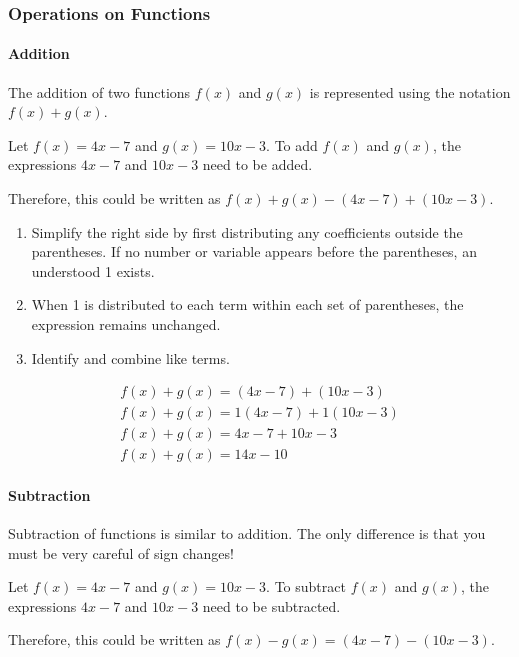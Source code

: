\subsubsection*{Operations on Functions}

\paragraph*{Addition}

The addition of two functions $f(x)$ and $g(x)$ is represented using the
notation $f(x) + g(x)$.

Let $f(x) = 4x - 7$ and $g(x) = 10x - 3$. To add $f(x)$ and $g(x)$, the
expressions $4x - 7$ and $10x - 3$ need to be added.

Therefore, this could be written as $f(x) + g(x) - (4x - 7) + (10x - 3)$.

\begin{enumerate}
    \item Simplify the right side by first distributing any coefficients
        outside the parentheses. If no number or variable appears before the
        parentheses, an understood 1 exists.
    \item When 1 is distributed to each term within each set of parentheses,
        the expression remains unchanged.
    \item Identify and combine like terms.
\end{enumerate}

\begin{align*}
    f(x) + g(x) = (4x - 7) + (10x - 3) \\
    f(x) + g(x) = 1(4x - 7) + 1(10x - 3) \\
    f(x) + g(x) = 4x - 7 + 10x - 3 \\
    f(x) + g(x) = 14x - 10
\end{align*}

\paragraph*{Subtraction}

Subtraction of functions is similar to addition. The only difference is that
you must be very careful of sign changes!

Let $f(x) = 4x - 7$ and $g(x) = 10x - 3$. To subtract $f(x)$ and $g(x)$, the
expressions $4x - 7$ and $10x - 3$ need to be subtracted.

Therefore, this could be written as $f(x) - g(x) = (4x - 7) - (10x - 3)$.

